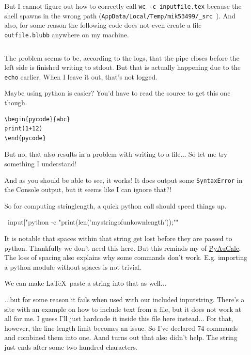 \documentclass{article} \usepackage[utf8]{inputenc}
\makeatletter
\newenvironment{pycode}[1]%
{\xdef\d@tn@me{#1}\xdef\r@ncmd{python #1.py > #1.plog}%
\typeout{Writing file #1}\VerbatimOut{#1.py}%
}
{\endVerbatimOut %
\toks0{\immediate\write18}%
\expandafter\toks\expandafter1\expandafter{\r@ncmd}%
 \edef\d@r@ncmd{\the\toks0{\the\toks1}}\d@r@ncmd %
 \noindent Input
 \inputminted{python}{\d@tn@me.py}%
 \noindent Output
 \inputminted{text}{\d@tn@me.plog}%
 }
\newcommand{\code}[1]{\colorbox{codebggray}{{\texttt{#1}}}}
\makeatother
\begin{document}
But I cannot figure out how to correctly call \texttt{wc -c inputfile.tex} because the shell spawns in the wrong path (\code{AppData/Local/Temp/mik53499/\_src }). And also, for some reason the following code does not even create a file \texttt{outfile.blubb} anywhere on my machine.
\begin{lstlisting}

\end{lstlisting}
The problem seems to be, according to the logs, that the pipe closes before the left side is finished writing to stdout. But that is actually happening due to the \texttt{echo} earlier. When I leave it out, that's not logged.

Maybe using python is easier? You'd have to read the source to get this one though.
\begin{lstlisting}
\begin{pycode}{abc}
print(1+12)
\end{pycode}
\end{lstlisting}
But no, that also results in a problem with writing to a file... So let me try something I understand!
\begin{mycode}

\end{mycode}

\newline
And as you should be able to see, it works!
It does output some \code{SyntaxError} in the Console output, but it seems like I can ignore that?!

So for computing stringlength, a quick python call should speed things up.
\begin{mycode}
\ input{|"python -c "print(len('mystringofunkownlength'));""}
\end{mycode}

\newline
It is notable that spaces within that string get lost before they are passed to python. Thankfully we don't need this here. But this reminds my of \href{https://ctftime.org/writeup/21982}{PyAuCalc}.
The loss of spacing also explains why some commands don't work. E.g. importing a python module without spaces is not trivial.

We can make \LaTeX\, paste a string into that as well...

\begin{mycode}
\def\mystr{hello}
\def\mystrtwo{\mystr}

\end{mycode}
\def\mystr{hello}
\def\mystrtwo{\mystr}

...but for some reason it fails when used with our included inputstring. There's a site with an example on how to include text from a file, but it does not work at all for me. I guess I'll just hardcode it inside this file here instead... For that, however, the line length limit becomes an issue. So I've declared 74 commands and combined them into one. Aand turns out that also didn't help. The string just ends after some two hundred characters.
\end{document}
